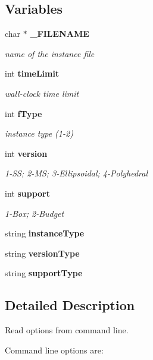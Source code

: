 \subsection*{Variables}
\begin{DoxyCompactItemize}
\item 
char $\ast$ \textbf{ \+\_\+\+F\+I\+L\+E\+N\+A\+ME}
\begin{DoxyCompactList}\small\item\em name of the instance file \end{DoxyCompactList}\item 
int \textbf{ time\+Limit}
\begin{DoxyCompactList}\small\item\em wall-\/clock time limit \end{DoxyCompactList}\item 
int \textbf{ f\+Type}
\begin{DoxyCompactList}\small\item\em instance type (1-\/2) \end{DoxyCompactList}\item 
int \textbf{ version}
\begin{DoxyCompactList}\small\item\em 1-\/\+SS; 2-\/\+MS; 3-\/\+Ellipsoidal; 4-\/\+Polyhedral \end{DoxyCompactList}\item 
int \textbf{ support}
\begin{DoxyCompactList}\small\item\em 1-\/\+Box; 2-\/\+Budget \end{DoxyCompactList}\item 
string \textbf{ instance\+Type}
\item 
string \textbf{ version\+Type}
\item 
string \textbf{ support\+Type}
\end{DoxyCompactItemize}


\subsection{Detailed Description}
Read options from command line. 

Command line options are\+:


